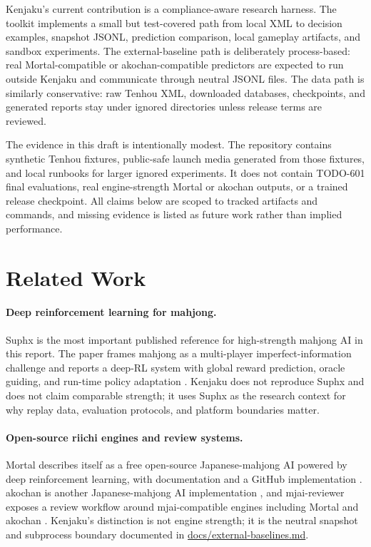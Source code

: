\documentclass[11pt]{article}
\begin{document}
Kenjaku's current contribution is a compliance-aware research harness. The toolkit implements a
small but test-covered path from local XML to decision examples, snapshot JSONL, prediction
comparison, local gameplay artifacts, and sandbox experiments. The external-baseline path is
deliberately process-based: real Mortal-compatible or akochan-compatible predictors are expected to
run outside Kenjaku and communicate through neutral JSONL files. The data path is similarly
conservative: raw Tenhou XML, downloaded databases, checkpoints, and generated reports stay under
ignored directories unless release terms are reviewed.

The evidence in this draft is intentionally modest. The repository contains synthetic Tenhou
fixtures, public-safe launch media generated from those fixtures, and local runbooks for larger
ignored experiments. It does not contain TODO-601 final evaluations, real engine-strength Mortal or
akochan outputs, or a trained release checkpoint. All claims below are scoped to tracked artifacts
and commands, and missing evidence is listed as future work rather than implied performance.

\section{Related Work}

\paragraph{Deep reinforcement learning for mahjong.}
Suphx is the most important published reference for high-strength mahjong AI in this report. The
paper frames mahjong as a multi-player imperfect-information challenge and reports a deep-RL system
with global reward prediction, oracle guiding, and run-time policy adaptation
\cite{suphx-arxiv}. Kenjaku does not reproduce Suphx and does not claim comparable strength; it
uses Suphx as the research context for why replay data, evaluation protocols, and platform
boundaries matter.

\paragraph{Open-source riichi engines and review systems.}
Mortal describes itself as a free open-source Japanese-mahjong AI powered by deep reinforcement
learning, with documentation and a GitHub implementation \cite{mortal-docs,mortal-github}. akochan
is another Japanese-mahjong AI implementation \cite{akochan-github}, and mjai-reviewer exposes a
review workflow around mjai-compatible engines including Mortal and akochan
\cite{mjai-reviewer}. Kenjaku's distinction is not engine strength; it is the neutral snapshot and
subprocess boundary documented in \href{../external-baselines.md}{docs/external-baselines.md}.
\end{document}
